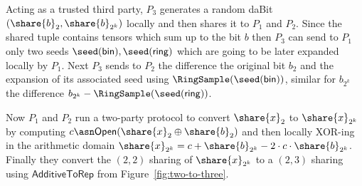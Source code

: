 Acting as a trusted third party, $P_3$ generates a random
daBit $(\share{b}_2, \share{b}_{2^k})$ locally and then shares it to $P_1$ and $P_2$. 
Since the shared tuple contains tensors which sum up to the bit $b$ then $P_3$ can
send to $P_1$ only two seeds $\seed(\mathsf{bin}), \seed(\mathsf{ring})$
which are going to be later expanded
locally by $P_1$. Next $P_3$ sends to $P_2$ the difference the original
bit $b_2$ and the expansion of its associated seed using  $\RingSample(\seed(\mathsf{bin}))$, similar for $b_{2^k}$ 
the difference $b_{2^k} - \RingSample(\seed(\mathsf{ring}))$.

Now $P_1$ and $P_2$ run a two-party protocol to convert $\share{x}_2$ to
$\share{x}_{2^k}$ by computing $c \asn \mathsf{Open}(\share{x}_2 \oplus
\share{b}_2)$ and then locally XOR-ing in the arithmetic domain
$\share{x}_{2^k} = c + \share{b}_{2^k} - 2 \cdot c \cdot \share{b}_{2^k}$.
Finally they convert the $(2,2)$ sharing of $\share{x}_{2^k}$ to a $(2,3)$
sharing using $\mathsf{AdditiveToRep}$ from Figure~\ref{fig:two-to-three}.




